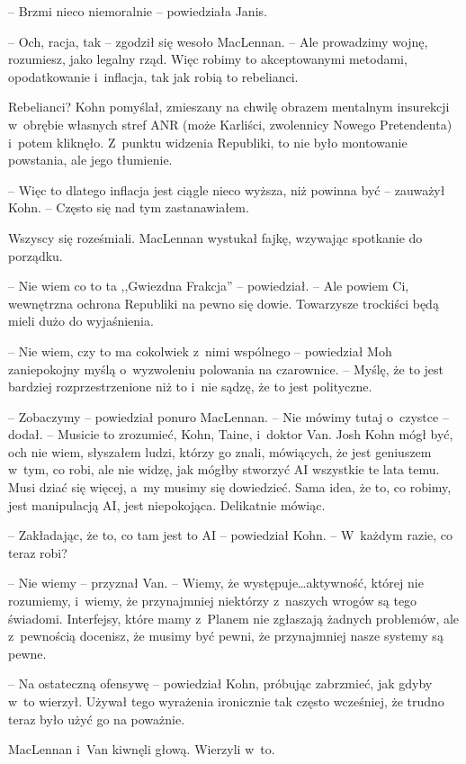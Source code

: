 \documentclass[oneside,polish,11pt,sfheadings]{mwbk}
\begin{document}
-- Brzmi nieco niemoralnie -- powiedziała Janis.

-- Och, racja, tak -- zgodził się wesoło MacLennan. -- Ale prowadzimy
wojnę, rozumiesz, jako legalny rząd. Więc robimy to akceptowanymi
metodami, opodatkowanie i~inflacja, tak jak robią to rebelianci.

Rebelianci? Kohn pomyślał, zmieszany na chwilę obrazem mentalnym
insurekcji w~obrębie własnych stref ANR (może Karliści, zwolennicy
Nowego Pretendenta) i~potem kliknęło. Z~punktu widzenia Republiki, to
nie było montowanie powstania, ale jego tłumienie.

-- Więc to dlatego inflacja jest ciągle nieco wyższa, niż powinna być -- zauważył Kohn. -- Często się nad tym zastanawiałem.

Wszyscy się roześmiali. MacLennan wystukał fajkę, wzywając spotkanie do
porządku.

-- Nie wiem co to ta ,,Gwiezdna Frakcja'' -- powiedział. -- Ale powiem Ci,
wewnętrzna ochrona Republiki na pewno się dowie. Towarzysze trockiści
będą mieli dużo do wyjaśnienia.

-- Nie wiem, czy to ma cokolwiek z~nimi wspólnego -- powiedział Moh
zaniepokojny myślą o~wyzwoleniu polowania na czarownice. -- Myślę, że to
jest bardziej rozprzestrzenione niż to i~nie sądzę, że to jest
polityczne.

-- Zobaczymy -- powiedział ponuro MacLennan. -- Nie mówimy tutaj o~czystce
-- dodał. -- Musicie to zrozumieć, Kohn, Taine, i~doktor Van. Josh Kohn
mógł być, och nie wiem, słyszałem ludzi, którzy go znali, mówiących, że
jest geniuszem w~tym, co robi, ale nie widzę, jak mógłby stworzyć AI
wszystkie te lata temu. Musi dziać się więcej, a~my musimy się
dowiedzieć. Sama idea, że to, co robimy, jest manipulacją AI, jest
niepokojąca. Delikatnie mówiąc.

-- Zakładając, że to, co tam jest to AI -- powiedział Kohn. -- W~każdym
razie, co teraz robi?

-- Nie wiemy -- przyznał Van. -- Wiemy, że występuje\ldots aktywność, której
nie rozumiemy, i~wiemy, że przynajmniej niektórzy z~naszych wrogów są
tego świadomi. Interfejsy, które mamy z~Planem nie zgłaszają żadnych
problemów, ale z~pewnością docenisz, że musimy być pewni, że
przynajmniej nasze systemy są pewne.

-- Na ostateczną ofensywę -- powiedział Kohn, próbując zabrzmieć, jak
gdyby w~to wierzył. Używał tego wyrażenia ironicznie tak często
wcześniej, że trudno teraz było użyć go na poważnie.

MacLennan i~Van kiwnęli głową. Wierzyli w~to.
\end{document}
